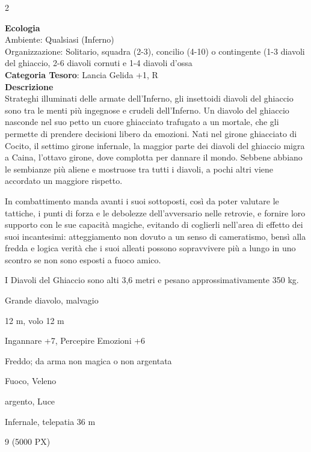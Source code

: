\begin{multicols}{2}
{\textbf{Ecologia}\\
Ambiente: Qualsiasi (Inferno)\\
Organizzazione: Solitario, squadra (2-3), concilio (4-10) o contingente (1-3 diavoli del ghiaccio, 2-6 diavoli cornuti e 1-4 diavoli d'ossa\\
\textbf{Categoria Tesoro}: Lancia Gelida +1, R\\
\textbf{Descrizione}\\
Strateghi illuminati delle armate dell'Inferno, gli insettoidi diavoli del ghiaccio sono tra le menti più ingegnose e crudeli dell'Inferno. Un diavolo del ghiaccio nasconde nel suo petto un cuore ghiacciato trafugato a un mortale, che gli permette di prendere decisioni libero da emozioni. Nati nel girone ghiacciato di Cocito, il settimo girone infernale, la maggior parte dei diavoli del ghiaccio migra a Caina, l'ottavo girone, dove complotta per dannare il mondo. Sebbene abbiano le sembianze più aliene e mostruose tra tutti i diavoli, a pochi altri viene accordato un maggiore rispetto.

In combattimento manda avanti i suoi sottoposti, così da poter valutare le tattiche, i punti di forza e le debolezze dell'avversario nelle retrovie, e fornire loro supporto con le sue capacità magiche, evitando di coglierli nell'area di effetto dei suoi incantesimi: atteggiamento non dovuto a un senso di cameratismo, bensì alla fredda e logica verità che i suoi alleati possono sopravvivere più a lungo in uno scontro se non sono esposti a fuoco amico.

I Diavoli del Ghiaccio sono alti 3,6 metri e pesano approssimativamente 350 kg.

\begin{description}[noitemsep, topsep=0pt, parsep=0pt, partopsep=0pt, itemsep=1pt, leftmargin=2.35cm,  labelwidth=2.2cm, itemindent=0cm, listparindent=0pt] %
\setlength{\baselineskip}{10pt}
\item[\textbf{Taglia/Tipo}] Grande diavolo, malvagio
\item[\textbf{Caratt.}] 
\item[\textbf{Punti Ferita}] 
\item[\textbf{Movimento}] 12 m, volo 12 m
\item[\textbf{Tiri Salvez.}] 
\item[\textbf{Comp.}] Ingannare +7, Percepire Emozioni +6
\item[\textbf{Res. Danni}] Freddo; da arma non magica o non argentata
\item[\textbf{Imm. Danni}] Fuoco, Veleno
\item[\textbf{Vulnerabilità}] argento, Luce
\item[\textbf{Sensi}] 
\item[\textbf{Linguaggi}] Infernale, telepatia 36 m
\item[\textbf{Sfida}] 9 (5000 PX)
\end{description}
\smallskip

}
\end{multicols}
